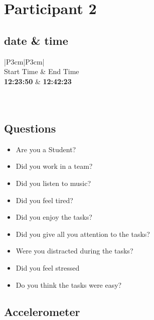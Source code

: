 \section{Participant 2}


\subsection{date \& time}
\begin{table}[ht]
  \begin{tabular}{|P{3cm}|P{3cm}|}
	    	\\ \hline
    Start Time      			& End Time   					\\ \hline
   \textbf{12:23:50} 	& \textbf{12:42:23}    	\\ \hline
       						\\ \hline
    			\\ \hline
  \end{tabular}
  \newline\newline
  \caption{p4: date and time}\label{dandt1}
\end{table}

\subsection{Questions}
\begin{itemize} 
  \item[\XSolidBrush] Are you a Student?
  \item[\Checkmark] Did you work in a team?
  \item[\Checkmark] Did you listen to music?
  \item[\XSolidBrush] Did you feel tired?
  \item[\Checkmark] Did you enjoy the tasks?
  \item[\Checkmark] Did you give all you attention to the tasks?
  \item[\XSolidBrush] Were you distracted during the tasks?
  \item[\XSolidBrush] Did you feel stressed
  \item[\Checkmark] Do you think the tasks were easy?  
\end{itemize}


\FloatBarrier
\newpage
\subsection{Accelerometer}

